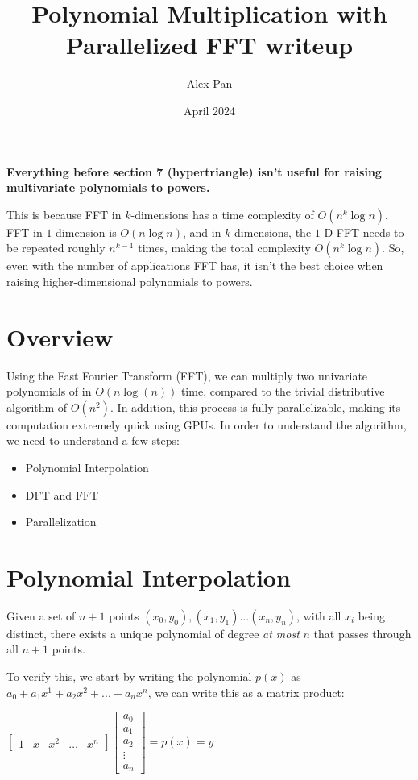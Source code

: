 \documentclass{article}
\title{Polynomial Multiplication with Parallelized FFT writeup}
\author{Alex Pan}
\date{April 2024}
\begin{document}
\maketitle

\textbf{Everything before section 7 (hypertriangle) isn't useful for raising multivariate polynomials to powers.}

This is because FFT in $k$-dimensions has a time complexity of $O(n^k \log{n})$. FFT in $1$ dimension is $O(n\log{n})$, and in $k$ dimensions, the $1$-D FFT needs to be repeated roughly $n^{k-1}$ times, making the total complexity $O(n^k \log{n})$. So, even with the number of applications FFT has, it isn't the best choice when raising higher-dimensional polynomials to powers.
\section{Overview}
Using the Fast Fourier Transform (FFT), we can multiply two univariate polynomials of in $O(n\log(n))$ time, compared to the trivial distributive algorithm of $O(n^2)$. In addition, this process is fully parallelizable, making its computation extremely quick using GPUs. In order to understand the algorithm, we need to understand a few steps:

\begin{itemize}
    \item Polynomial Interpolation 
    \item DFT and FFT
    \item Parallelization
\end{itemize}

\section{Polynomial Interpolation}
Given a set of $n+1$ points $(x_0,y_0), (x_1,y_1) ... (x_n, y_n)$, with all $x_i$ being distinct, there exists a unique polynomial of degree \textit{at most} $n$ that passes through all $n+1$ points.

To verify this, we start by writing the polynomial $p(x)$ as $a_0 + a_1x^1 + a_2x^2 + ... + a_nx^n$, we can write this as a matrix product:

\centerline{$\begin{bmatrix} 1 & x & x^2 & \ldots & x^n \end{bmatrix}\begin{bmatrix} a_0 \\ a_1 \\ a_2 \\ \vdots \\ a_n \end{bmatrix} = p(x) = y$}
\end{document}
